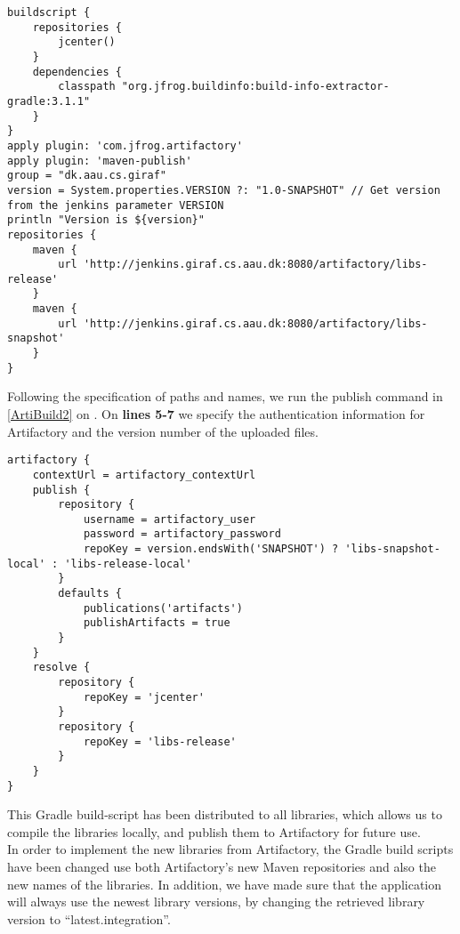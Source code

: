 \begin{minipage}[H]{\linewidth}
\begin{lstlisting}[caption = Specifying file names and subfolder paths on Artifactory, label = ArtiBuild1] 
buildscript {
    repositories {
        jcenter()
    }
    dependencies {
        classpath "org.jfrog.buildinfo:build-info-extractor-gradle:3.1.1"
    }
}
apply plugin: 'com.jfrog.artifactory'
apply plugin: 'maven-publish'
group = "dk.aau.cs.giraf"
version = System.properties.VERSION ?: "1.0-SNAPSHOT" // Get version from the jenkins parameter VERSION
println "Version is ${version}"
repositories {
    maven {
        url 'http://jenkins.giraf.cs.aau.dk:8080/artifactory/libs-release'
    }
    maven {
        url 'http://jenkins.giraf.cs.aau.dk:8080/artifactory/libs-snapshot'
    }
}
\end{lstlisting}
\end{minipage}

Following the specification of paths and names, we run the publish command in
\autoref{ArtiBuild2} on \label{lines 3-19}. On \textbf{lines 5-7} we specify the
authentication information for Artifactory and the version number of the
uploaded files.\nl

\begin{minipage}[H]{\linewidth}
\begin{lstlisting}[caption = Publishing the compiled libraries to Artifactory, label = ArtiBuild2] 
artifactory {
    contextUrl = artifactory_contextUrl
    publish {
        repository {
            username = artifactory_user
            password = artifactory_password
            repoKey = version.endsWith('SNAPSHOT') ? 'libs-snapshot-local' : 'libs-release-local'
        }
        defaults {
            publications('artifacts')
            publishArtifacts = true
        }
    }
    resolve {
        repository {
            repoKey = 'jcenter'
        }
        repository {
            repoKey = 'libs-release'
        }
    }
}
\end{lstlisting}
\end{minipage}

This Gradle build-script has been distributed to all libraries, which allows us
to compile the libraries locally, and publish them to Artifactory for future
use.\\
In order to implement the new libraries from Artifactory, the Gradle
build scripts have been changed use both Artifactory's new Maven
repositories and also the new names of the libraries. In addition, we have made
sure that the application will always use the newest library versions, by
changing the retrieved library version to ``latest.integration''.\nl

